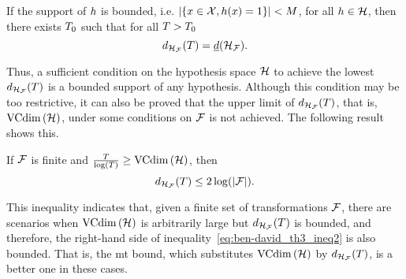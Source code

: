\begin{theorem}
    If the support of $h$ is bounded, i.e. $ \left|\left\{x \in \mathcal{X},  h(x) = 1\right\}\right| < M$, for all $h \in \mathcal{H}$, then there exists $T_0$ such that for all $T>T_0$
    \begin{equation}
        \nonumber
        d_{\mathcal{H}_{\mathcal{F}}}(T) = \underline{d}(\mathcal{H}_{\mathcal{F}}).
    \end{equation} 
\end{theorem}
Thus, a sufficient condition on the hypothesis space $\mathcal{H}$ to achieve the lowest $d_{\mathcal{H}_{\mathcal{F}}}(T)$ is a bounded support of any hypothesis. Although this condition may be too restrictive, it can also be proved that the upper limit of $d_{\mathcal{H}_{\mathcal{F}}}(T)$, that is, $\operatorname{VCdim}\left(\mathcal{H}\right)$, under some conditions on $\mathcal{F}$ is not achieved. 
%
The following result~\cite[Theorem~6]{Ben-DavidB08} shows this.
\begin{theorem}\label{th:ben-david_th6}
    If $\mathcal{F}$ is finite and $\frac{T}{\log (T)} \geq \operatorname{VCdim}\left(\mathcal{H}\right)$, then
    \begin{equation}
        \nonumber
        d_{\mathcal{H}_{\mathcal{F}}}(T) \leq 2 \log(\left|\mathcal{F}\right|) .
    \end{equation}
\end{theorem}
This inequality indicates that, given a finite set of transformations $\mathcal{F}$, there are scenarios when $\operatorname{VCdim}\left(\mathcal{H}\right)$ is arbitrarily large but $d_{\mathcal{H}_{\mathcal{F}}}(T)$ is bounded, and therefore, the right-hand side of inequality~\eqref{eq:ben-david_th3_ineq2} is also bounded. That is, the \acrshort{mt} bound, which substitutes $\operatorname{VCdim}\left(\mathcal{H}\right)$ by $d_{\mathcal{H}_{\mathcal{F}}}(T)$, is a better one in these cases. 



